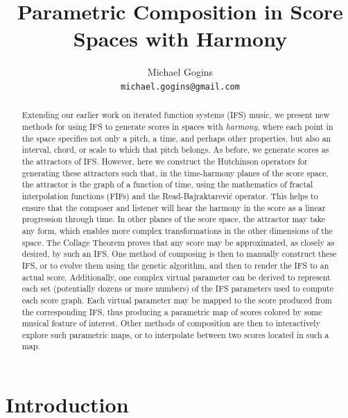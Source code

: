 \documentclass[english,11pt,letterpaper,onecolumn]{scrartcl}
\numberwithin{equation}{section}
\begin{document}
\title{Parametric Composition in Score Spaces with Harmony} \author{Michael
Gogins \\ \texttt{michael.gogins@gmail.com}} \maketitle

\begin{abstract}
Extending our earlier work on iterated function systems (IFS) music, we present
new methods for using IFS to generate scores in spaces with \emph{harmony},
where each point in the space specifies not only a pitch, a time, and perhaps
other properties, but also an interval, chord, or scale to which that pitch
belongs. As before, we generate scores as the attractors of IFS. However, here
we construct the Hutchinson operators for generating these attractors such that,
in the time-harmony planes of the score space, the attractor is the graph of a
function of time, using the mathematics of fractal interpolation functions
(FIFs) and the Read-Bajraktarevi\'c operator. This helps to ensure that the
composer and listener will hear the harmony in the score as a linear progression
through time. In other planes of the score space, the attractor may take any
form, which enables more complex transformations in the other dimensions of the
space. The Collage Theorem proves that any score may be approximated, as closely
as desired, by such an IFS. One method of composing is then to manually
construct these IFS, or to evolve them using the genetic algorithm, and then to
render the IFS to an actual score. Additionally, one complex virtual parameter
can be derived to represent each set (potentially dozens or more numbers) of the
IFS parameters used to compute each score graph. Each virtual parameter may be
mapped to the score produced from the corresponding IFS, thus producing a
parametric map of scores colored by some musical feature of interest. Other
methods of composition are then to interactively explore such parametric maps,
or to interpolate between two scores located in such a map.
\end{abstract}


\section{Introduction}

\end{document}
